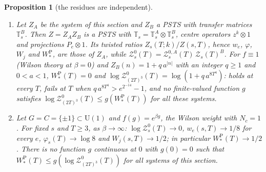 \documentclass[11pt,a4paper]{amsart}
\newtheorem{proposition}[theorem]{Proposition}
\theoremstyle{definition}
\theoremstyle{remark}
\numberwithin{equation}{section}
\newcommand{\U}{\mathrm{U}}                %
\newcommand{\PSTS}{\textup{PSTS}}          %
\newcommand{\TT}{\mathbb{T}}               %
\newcommand{\Zpart}[2]{Z(#1,#2)}           %
\newcommand{\Zc}{\mathcal{Z}}              %
\newcommand{\Zs}[2]{\Zc_{#1}(#2)}          %
\newcommand{\cube}[1]{(2#1)^3}             %
\newcommand{\hypN}{\text{\upshape(N)}}              %
\newcommand{\hypP}{\text{\upshape(P)}}              %
\begin{document}
\begin{proposition}[the residues are independent]\label{prop:no-residue-control}
\begin{enumerate}[label=\textup{(\alph*)},leftmargin=*]
\item Let $Z_A$ be the system of this section and $Z_B$ a \PSTS{} with transfer matrices $\TT^B_s$. Then $Z=Z_AZ_B$ is a \PSTS{} with $\TT_s=\TT^A_s\otimes\TT^B_s$, centre operators $z^k\otimes1$ and projections $P_e\otimes1$. Its twisted ratios $Z_s(T;k)/\Zpart{s}{T}$, hence $w_e$, $\varphi$, $W_j$ and $W^{\mathrm P}_*$, are those of $Z_A$, while $\Zc^0_s(T)=\Zc^{0,A}_s(T)\,\Zs{s}{T}^B$. For $f\equiv1$ \textup{(}Wilson theory at $\beta=0$\textup{)} and $Z_B(n)=1+q\,a^{|n|}$ with an integer $q\ge1$ and $0<a<1$, $W^{\mathrm P}_*(T)=0$ and $\log\Zc^0_{\cube T}(T)=\log(1+q\,a^{8T^4})$: \hypP{} holds at every $T$, \hypN{} fails at $T$ when $q\,a^{8T^4}>e^{2^{-14}}-1$, and no finite-valued function $g$ satisfies $\log\Zc^0_{\cube T}(T)\le g(W^{\mathrm P}_*(T))$ for all these systems.
\item Let $G=C=\{\pm1\}\subset\U(1)$ and $f(g)=e^{\beta g}$, the Wilson weight with $N_c=1$. For fixed $s$ and $T\ge3$, as $\beta\to\infty$: $\log\Zc^0_s(T)\to0$, $w_e(s,T)\to1/8$ for every $e$, $\varphi_s(T)\to\log8$ and $W_j(s,T)\to1/2$; in particular $W^{\mathrm P}_*(T)\to1/2$. There is no function $g$ continuous at $0$ with $g(0)=0$ such that $W^{\mathrm P}_*(T)\le g(\log\Zc^0_{\cube T}(T))$ for all systems of this section.
\end{enumerate}
\end{proposition}
\end{document}
